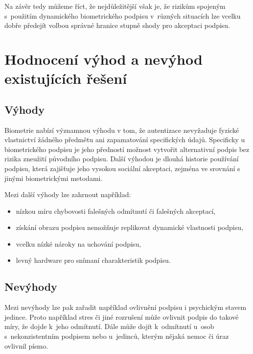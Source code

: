 Na závěr tedy můžeme říct, že nejdůležitější však je, že rizikům spojeným s~použitím dynamického biometrického podpisu v~různých situacích lze vcelku dobře 
předejít volbou správné hranice stupně shody pro akceptaci podpisu.~\cite{8585636} %

\section{Hodnocení výhod a nevýhod existujících řešení}
\subsection*{Výhody}
Biometrie nabízí významnou výhodu v tom, že autentizace nevyžaduje fyzické vlastnictví žádného předmětu ani zapamatování specifických údajů. 
Specificky u biometrického podpisu je jeho předností možnost vytvořit alternativní podpis bez rizika zneužití původního podpisu. 
Další výhodou je dlouhá historie používání podpisu, která zajišťuje jeho vysokou sociální akceptaci, zejména ve srovnání s jinými biometrickými metodami. 
\newline

\noindent
Mezi další výhody lze zahrnout například:

\begin{itemize}
  \item nízkou míru chybovosti falešných odmítnutí či falešných akceptací,
  \item získání obrazu podpisu nemožňuje replikovat dynamické vlastnosti podpisu,
  \item vcelku nízké nároky na uchování podpisu,
  \item levný hardware pro snímaní charakteristik podpisu.
\end{itemize}

\subsection*{Nevýhody}
Mezi nevýhody lze pak zařadit například ovlivnění podpisu i psychickým stavem jedince.
Proto například stres či jiné rozrušení může ovlivnit podpis do takové míry, že dojde k~jeho odmítnutí.
Dále může dojít k~odmítnutí u~osob s~nekonzistentním podpisem nebo u~jedinců, kterým nějaká nemoc či úraz ovlivnil písmo.


